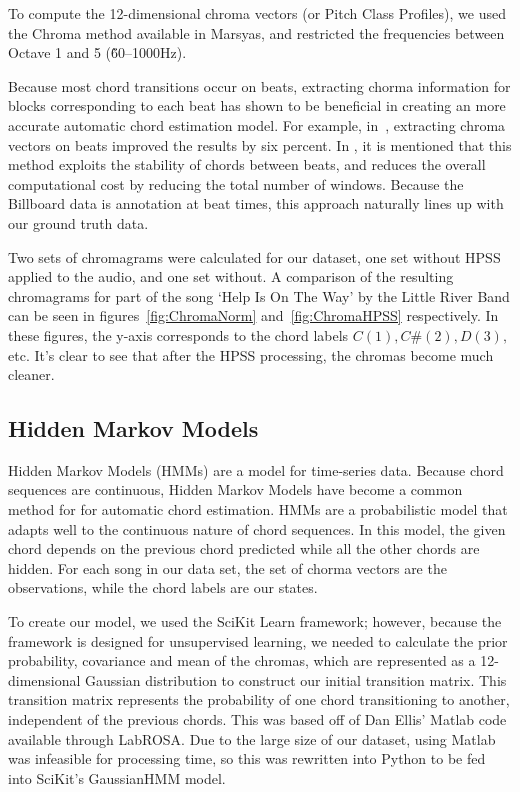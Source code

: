 \documentclass{article}
\begin{document}
To compute the 12-dimensional chroma vectors (or Pitch Class Profiles), we used
the Chroma method available in Marsyas, and restricted the frequencies between
Octave 1 and 5 (\~60--1000Hz).

Because most chord transitions occur on beats, extracting chorma information for
blocks corresponding to each beat has shown to be beneficial in creating an
more accurate automatic chord estimation model. For example, in~\cite{Zenz:20},
extracting chroma vectors on beats improved the results by six percent. In
\cite{McVicor:00}, it is mentioned that this method exploits the stability of
chords between beats, and reduces the overall computational cost by reducing
the total number of windows. Because the Billboard data is annotation at beat
times, this approach naturally lines up with our ground truth data.

Two sets of chromagrams were calculated for our dataset, one set without HPSS
applied to the audio, and one set without. A comparison of the resulting
chromagrams for part of the song `Help Is On The Way' by the Little River Band
can be seen in figures~\ref{fig:ChromaNorm} and~\ref{fig:ChromaHPSS}
respectively. In these figures, the y-axis corresponds to the chord labels
$ C(1), C\#(2), D(3), $ etc. It's clear to see that after the HPSS processing, the
chromas become much cleaner.

\subsection{Hidden Markov Models}

Hidden Markov Models (HMMs) are a model for time-series data. Because chord
sequences are continuous,  Hidden Markov Models have become a common method for
for automatic chord estimation. HMMs are a probabilistic model that adapts well
to the continuous nature of chord sequences. In this model, the given chord
depends on the previous chord predicted while all the other chords are hidden.
For each song in our data set, the set of chorma vectors are the observations,
while the chord labels are our states.

To create our model, we used the SciKit Learn framework; however, because the
framework is designed for unsupervised learning, we needed to calculate the
prior probability, covariance and mean of the chromas, which are represented as
a 12-dimensional Gaussian distribution to construct our initial transition
matrix.  This transition matrix represents the probability of one chord
transitioning to another, independent of the previous chords.  This was based
off of Dan Ellis' Matlab code available through LabROSA\@. Due to the large size
of our dataset, using Matlab was infeasible for processing time, so this was
rewritten into Python to be fed into SciKit's GaussianHMM model.
\end{document}
